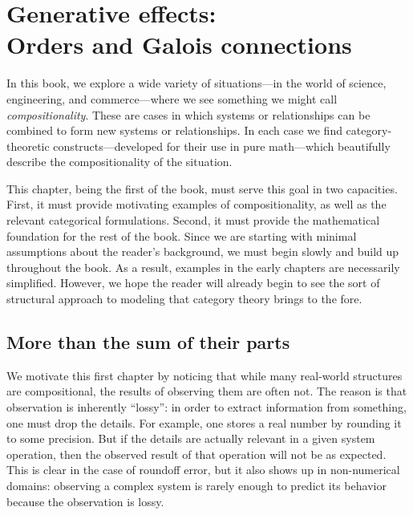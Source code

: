 \documentclass[7Sketches]{subfiles}
\begin{document}
%

\setcounter{chapter}{0}%


\chapter[Generative effects: Orders and adjunctions]{Generative effects:\\Orders and Galois connections} %
\label{chap.preorders}


In this book, we explore a wide variety of situations---in the world of science, engineering, and commerce---where we see something we might call \emph{compositionality}. These are cases in which systems or relationships can be combined to form new systems or relationships. In each case we find category-theoretic constructs---developed for their use in pure math---which beautifully describe the compositionality of the situation.%

This chapter, being the first of the book, must serve this goal in two capacities. First, it must provide motivating examples of compositionality, as well as the relevant categorical formulations. Second, it must provide the mathematical foundation for the rest of the book. Since we are starting with minimal assumptions about the reader's background, we must begin slowly and build up throughout the book. As a result, examples in the early chapters are necessarily simplified. However, we hope the reader will already begin to see the sort of structural approach to modeling that category theory brings to the fore.

\section{More than the sum of their parts}%
\label{sec.motivate_1}


We motivate this first chapter by noticing that while many real-world structures
are compositional, the results of observing them are often not. The reason is that observation is inherently ``lossy'': in order to extract information from something, one must drop the details. For example, one stores a real number by rounding it to some precision. But if the details are actually relevant in a given system operation, then the observed result of that operation will not be as expected. This is clear in the case of roundoff error, but it also shows up in non-numerical domains: observing a complex system is rarely enough to predict its behavior because the observation is lossy.
\end{document}
